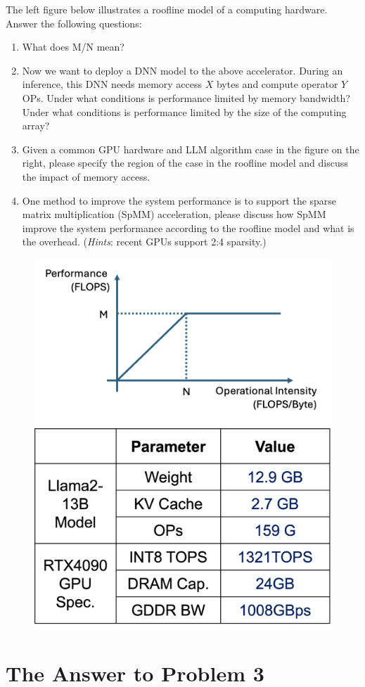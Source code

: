 \documentclass[11pt, a4 paper]{article}
\begin{document}
The left figure below illustrates a roofline model of a computing hardware. Answer the following questions:
\begin{enumerate}[nosep]
    \item What does M/N mean?
    \item Now we want to deploy a DNN model to the above accelerator. During an inference, this DNN needs memory access $X$ bytes and compute operator $Y$ OPs. Under what conditions is performance limited by memory bandwidth? Under what conditions is performance limited by the size of the computing array?
    \item Given a common GPU hardware and LLM algorithm case in the figure on the right, please specify the region of the case in the roofline model and discuss the impact of memory access.
    \item One method to improve the system performance is to support the sparse matrix multiplication (SpMM) acceleration, please discuss how SpMM improve the system performance according to the roofline model and what is the overhead. (\emph{Hints}: recent GPUs support 2:4 sparsity.)
\end{enumerate}

\begin{figure}[h]
    \centering
    \includegraphics[width=0.48\linewidth]{image/roofline.png}
    \includegraphics[width=0.36\linewidth]{image/roofline-4090.png}
    
\end{figure}
\section{The Answer to Problem 3}
\end{document}
